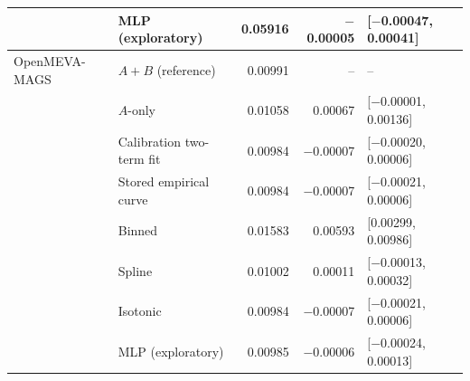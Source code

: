 \begin{tabular}{llrrl}
 & MLP (exploratory) & 0.05916 & $-$0.00005 & [$-$0.00047, 0.00041] \\
\midrule
OpenMEVA-MAGS & $A{+}B$ (reference) & 0.00991 & -- & -- \\
 & $A$-only & 0.01058 & 0.00067 & [$-$0.00001, 0.00136] \\
 & Calibration two-term fit & 0.00984 & $-$0.00007 & [$-$0.00020, 0.00006] \\
 & Stored empirical curve & 0.00984 & $-$0.00007 & [$-$0.00021, 0.00006] \\
 & Binned & 0.01583 & 0.00593 & [0.00299, 0.00986] \\
 & Spline & 0.01002 & 0.00011 & [$-$0.00013, 0.00032] \\
 & Isotonic & 0.00984 & $-$0.00007 & [$-$0.00021, 0.00006] \\
 & MLP (exploratory) & 0.00985 & $-$0.00006 & [$-$0.00024, 0.00013] \\
\bottomrule
\end{tabular}
